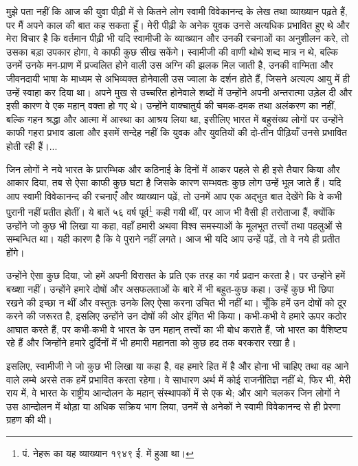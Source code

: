मुझे पता नहीं कि आज की युवा पीढ़ी में से कितने लोग स्वामी विवेकानन्द के लेख तथा व्याख्यान पढ़ते हैं, पर मैं अपने काल की बात कह सकता हूँ। मेरी पीढ़ी के अनेक युवक उनसे अत्यधिक प्रभावित हुए थे और मेरा विचार है कि वर्तमान पीढ़ी भी यदि स्वामीजी के व्याख्यान और उनकी रचनाओं का अनुशीलन करे, तो उसका बड़ा उपकार होगा, वे काफी कुछ सीख सकेंगे। स्वामीजी की वाणी थोथे शब्द मात्र न थे, बल्कि उनमें उनके मन-प्राण में प्रज्वलित होने वाली उस अग्नि की झलक मिल जाती है, उनकी वाग्मिता और जीवनदायी भाषा के माध्यम से अभिव्यक्त होनेवाली उस ज्वाला के दर्शन होते हैं, जिसने अत्यल्प आयु में ही उन्हें स्वाहा कर दिया था। अपने मुख से उच्चरित होनेवाले शब्दों में उन्होंने अपनी अन्तरात्मा उड़ेल दी और इसी कारण वे एक महान् वक्ता हो गए थे। उन्होंने वाक्चातुर्य की चमक-दमक तथा अलंकरण का नहीं, बल्कि गहन श्रद्धा और आत्मा में आस्था का आश्रय लिया था, इसीलिए भारत में बहुसंख्य लोगों पर उन्होंने काफी गहरा प्रभाव डाला और इसमें सन्देह नहीं कि युवक और युवतियों की दो-तीन पीढ़ियाँ उनसे प्रभावित होती रही हैं।... 

जिन लोगों ने नये भारत के प्रारम्भिक और कठिनाई के दिनों में आकर पहले से ही इसे तैयार किया और आकार दिया, तब से ऐसा काफी कुछ घटा है जिसके कारण सम्भवतः कुछ लोग उन्हें भूल जाते हैं। यदि आप स्वामी विवेकानन्द की रचनाएँ और व्याख्यान पढ़ें, तो उनमें आप एक अद्भुत बात देखेंगे कि वे कभी पुरानी नहीं प्रतीत होतीं। ये बातें ५६ वर्ष पूर्व\footnote{ पं. नेहरू का यह व्याख्यान १९४९ ई. में हुआ था।} कही गयी थीं, पर आज भी वैसी ही तरोताजा हैं, क्योंकि उन्होंने जो कुछ भी लिखा या कहा, वहाँ हमारी अथवा विश्व समस्याओं के मूलभूत तत्त्वों तथा पहलुओं से सम्बन्धित था। यही कारण है कि वे पुराने नहीं लगते। आज भी यदि आप उन्हें पढ़ें, तो वे नये ही प्रतीत होंगे। 

उन्होंने ऐसा कुछ दिया, जो हमें अपनी विरासत के प्रति एक तरह का गर्व प्रदान करता है। पर उन्होंने हमें बख्शा नहीं। उन्होंने हमारे दोषों और असफलताओं के बारे में भी बहुत-कुछ कहा। उन्हें कुछ भी छिपा रखने की इच्छा न थीं और वस्तुतः उनके लिए ऐसा करना उचित भी नहीं था। चूँकि हमें उन दोषों को दूर करने की जरूरत है, इसलिए उन्होंने उन दोषों की ओर इंगित भी किया। कभी-कभी वे हमारे ऊपर कठोर आघात करते हैं, पर कभी-कभी वे भारत के उन महान् तत्त्वों का भी बोध कराते हैं, जो भारत का वैशिष्ट्य रहे हैं और जिन्होंने हमारे दुर्दिनों में भी हमारी महानता को कुछ हद तक बरकरार रखा है। 

इसलिए, स्वामीजी ने जो कुछ भी लिखा या कहा है, वह हमारे हित में है और होना भी चाहिए तथा वह आने वाले लम्बे अरसे तक हमें प्रभावित करता रहेगा। वे साधारण अर्थ में कोई राजनीतिज्ञ नहीं थे, फिर भी, मेरी राय में, वे भारत के राष्ट्रीय आन्दोलन के महान् संस्थापकों में से एक थे; और आगे चलकर जिन लोगों ने उस आन्दोलन में थोड़ा या अधिक सक्रिय भाग लिया, उनमें से अनेकों ने स्वामी विवेकानन्द से ही प्रेरणा ग्रहण की थी। 

